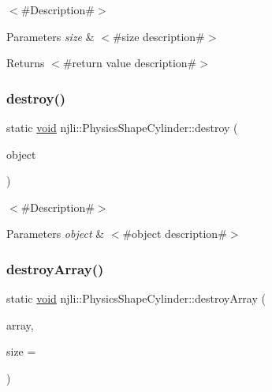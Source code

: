 $<$\#\+Description\#$>$


\begin{DoxyParams}{Parameters}
{\em size} & $<$\#size description\#$>$\\
\hline
\end{DoxyParams}
\begin{DoxyReturn}{Returns}
$<$\#return value description\#$>$ 
\end{DoxyReturn}
\mbox{\label{classnjli_1_1_physics_shape_cylinder_a4af110c841b136ee56c4cd6185ab4633}} 
\subsubsection{\texorpdfstring{destroy()}{destroy()}}
{\footnotesize\ttfamily static \mbox{\hyperlink{_thread_8h_af1e856da2e658414cb2456cb6f7ebc66}{void}} njli\+::\+Physics\+Shape\+Cylinder\+::destroy (\begin{DoxyParamCaption}\item[{\mbox{\hyperlink{classnjli_1_1_physics_shape_cylinder}{Physics\+Shape\+Cylinder}} $\ast$}]{object }\end{DoxyParamCaption})\hspace{0.3cm}{\ttfamily [static]}}

$<$\#\+Description\#$>$


\begin{DoxyParams}{Parameters}
{\em object} & $<$\#object description\#$>$ \\
\hline
\end{DoxyParams}
\mbox{\label{classnjli_1_1_physics_shape_cylinder_a206e5561c42493f64037429253d5b715}} 
\subsubsection{\texorpdfstring{destroy\+Array()}{destroyArray()}}
{\footnotesize\ttfamily static \mbox{\hyperlink{_thread_8h_af1e856da2e658414cb2456cb6f7ebc66}{void}} njli\+::\+Physics\+Shape\+Cylinder\+::destroy\+Array (\begin{DoxyParamCaption}\item[{\mbox{\hyperlink{classnjli_1_1_physics_shape_cylinder}{Physics\+Shape\+Cylinder}} $\ast$$\ast$}]{array,  }\item[{const \mbox{\hyperlink{_util_8h_a10e94b422ef0c20dcdec20d31a1f5049}{u32}}}]{size = {} }\end{DoxyParamCaption})\hspace{0.3cm}{\ttfamily [static]}}

